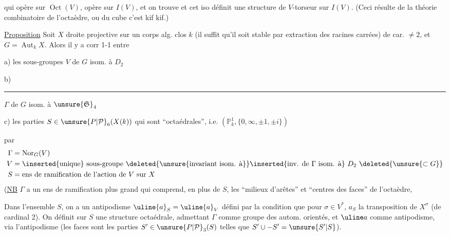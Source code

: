 qui opère sur $\operatorname{Oct}(V)$, opère sur $I(V)$, et on trouve
et cet iso  définit une structure de
$V$-torseur sur $I(V)$. (Ceci résulte de la théorie
combinatoire de l'octaèdre, ou du cube c'est kif kif.)

\uline{Proposition} Soit $X$ droite projective  sur un corps alg. clos $k$
(il suffit qu'il  soit stable par extraction des racines
carrées) de car. $\ne2$, et $G=\operatorname{Aut}_kX$. Alors il y a corr 1-1
entre

a) les sous-groupes $V$ de $G$ isom. à $D_2$

b) \rule{3cm}{0.2pt} $\Gamma$ de $G$ isom. à $\unsure{\mathfrak S}_4$ 

c) les parties $S\in\unsure{P|\mathcal P}_6(X(k))$ qui sont ``octaédrales'', i.e.
 $(\mathbb P^1_k,\{0,\infty,\pm1,\pm i\})$

par
\[
\begin{aligned}
\Gamma&=\operatorname{Nor}_G(V)\\
V&=\inserted{\text{unique}}\ \text{sous-groupe }\deleted{\text{\unsure{invariant isom. à}}}\inserted{\text{inv. de }\Gamma\ \text{isom. à}}\ D_2\ \deleted{\unsure{\subset G}}\\
S&=\text{ens de ramification de l'action de }V\text{ sur }X
\end{aligned}
\]
(\uline{NB} $\Gamma$ a un ens de ramification
plus grand qui comprend, en plus de $S$,
les ``milieux d'arêtes'' et ``centres des faces''
de l'octaèdre,


Dans l'ensemble $S$, on a un antipodisme $\uline{a}_S=\uline{a}_V$
défini par la condition que pour $\sigma\in V^*$, $a_S$  la transposition
de $X^\sigma$ (de cardinal 2). On définit sur $S$ une
structure octaédrale, admettant $\Gamma$ comme groupe des
autom. orientés, et $\uline a$ comme antipodisme, via l'antipodisme
(les faces sont les parties $S'\in\unsure{P|\mathcal P}_3(S)$ telles que $S'\cup-S'=\unsure{S'|S}$).

